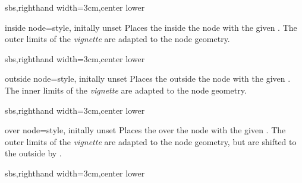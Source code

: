 \begin{dispExample*}{sbs,righthand width=3cm,center lower}
\end{dispExample*}

\enlargethispage*{1cm}

\begin{vigTcbKey}[][doc new=2016-04-22]{inside node}{=}{style, initally unset}
  Places the  inside the node with the given .
  The outer limits of the \emph{vignette} are adapted to the node geometry.
\begin{dispExample*}{sbs,righthand width=3cm,center lower}
\end{dispExample*}
\end{vigTcbKey}

\clearpage

\begin{vigTcbKey}[][doc new=2016-04-22]{outside node}{=}{style, initally unset}
  Places the  outside the node with the given .
  The inner limits of the \emph{vignette} are adapted to the node geometry.
\begin{dispExample*}{sbs,righthand width=3cm,center lower}
\end{dispExample*}
\end{vigTcbKey}


\begin{vigTcbKey}[][doc new=2016-04-22]{over node}{=}{style, initally unset}
  Places the  over the node with the given .
  The outer limits of the \emph{vignette} are adapted to the node geometry, but
  are shifted to the outside by .
\begin{dispExample*}{sbs,righthand width=3cm,center lower}
\end{dispExample*}
\end{vigTcbKey}

